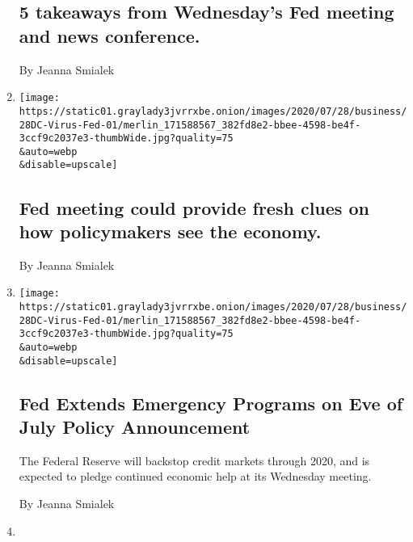 \begin{enumerate}
  \hypertarget{5-takeaways-from-wednesdays-fed-meeting-and-news-conference}{%
  \subsection{5 takeaways from Wednesday's Fed meeting and news
  conference.}\label{5-takeaways-from-wednesdays-fed-meeting-and-news-conference}}

  By Jeanna Smialek
\item
  \href{/2020/07/29/business/fed-meeting-could-provide-fresh-clues-on-how-policymakers-see-the-economy.html}{}

  \texttt{[image: https://static01.graylady3jvrrxbe.onion/images/2020/07/28/business/28DC-Virus-Fed-01/merlin\_171588567\_382fd8e2-bbee-4598-be4f-3ccf9c2037e3-thumbWide.jpg?quality=75\\\&auto=webp\\\&disable=upscale]}

  \hypertarget{fed-meeting-could-provide-fresh-clues-on-how-policymakers-see-the-economy}{%
  \subsection{Fed meeting could provide fresh clues on how policymakers
  see the
  economy.}\label{fed-meeting-could-provide-fresh-clues-on-how-policymakers-see-the-economy}}

  By Jeanna Smialek
\item
  \href{/2020/07/28/business/economy/coronavirus-federal-reserve-policy.html}{}

  \texttt{[image: https://static01.graylady3jvrrxbe.onion/images/2020/07/28/business/28DC-Virus-Fed-01/merlin\_171588567\_382fd8e2-bbee-4598-be4f-3ccf9c2037e3-thumbWide.jpg?quality=75\\\&auto=webp\\\&disable=upscale]}

  \hypertarget{fed-extends-emergency-programs-on-eve-of-july-policy-announcement}{%
  \subsection{Fed Extends Emergency Programs on Eve of July Policy
  Announcement}\label{fed-extends-emergency-programs-on-eve-of-july-policy-announcement}}

  The Federal Reserve will backstop credit markets through 2020, and is
  expected to pledge continued economic help at its Wednesday meeting.

  By Jeanna Smialek
\item
  \href{/2020/07/28/business/the-fed-will-extend-its-emergency-programs-through-2020.html}{}


\end{enumerate}

